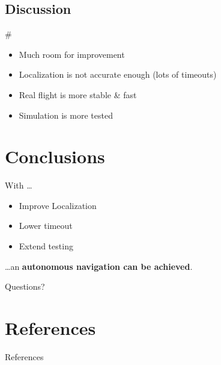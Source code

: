 \documentclass[]{beamer}
\def\mOrangeItem{\item[\textcolor{orange}{\textbullet}]}
\newcommand{\mSlideTitle}{{{\color{gray}\secname}} \# \subsecname}
\begin{document}

\subsection{Discussion}
\begin{frame}{\mSlideTitle}
  \begin{itemize}
    \mOrangeItem Much room for improvement
    \mOrangeItem Localization is not accurate enough (lots of timeouts)
    \mOrangeItem Real flight is more stable \& fast
    \mOrangeItem Simulation is more tested
  \end{itemize}
\end{frame}

\section{Conclusions}
\begin{frame}{\secname}
  With \dots
  \begin{itemize}
    \mOrangeItem Improve Localization
    \mOrangeItem Lower timeout
    \mOrangeItem Extend testing
  \end{itemize}
  \dots an \textbf{autonomous navigation can be achieved}.
\end{frame}

\begin{frame}[standout]
  Questions?
\end{frame}

\section{References}
\begin{frame}[allowframebreaks]{References}
  \printbibliography%
\end{frame}
\end{document}
